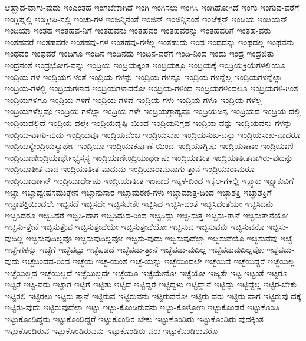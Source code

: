 {ಆಹ್ಲಾದ-ವಾಗು-ವುದು
ಇಂಎಂತಹ
ಇಂಗಬೇಕಾಗಿದೆ
ಇಂಗಿ
ಇಂಗಿಸಲು
ಇಂಗಿಸಿ
ಇಂಗಿಹೋಗಿದೆ
ಇಂಗು
ಇಂಗುವ-ವರೆಗೆ
ಇಂಗ್ಲಿಷ್ನಲ್ಲಿ
ಇಂಗ್ಲೀಷಿ-ನಲ್ಲಿ
ಇಂಚು-ಗಳ
ಇಂಜನ್ನಿನಂತೆ
ಇಂಜಿನ್
ಇಂಜಿನ್ನಿನಂತೆ
ಇಂಜೆಕ್ಷನ್
ಇಂಡಿಯ
ಇಂಡಿಯನ್
ಇಂಡಿಯಾ
ಇಂತಹ
ಇಂತಹವ-ನಿಗೆ
ಇಂತಹವನು
ಇಂತಹವರ
ಇಂತಹವರನ್ನು
ಇಂತಹವರಿಗೆ
ಇಂತಹ-ವರು
ಇಂತಹವರೆ
ಇಂತಹವರೇ
ಇಂತಹವು-ಗಳ
ಇಂತಹವು-ಗಳೆಲ್ಲ
ಇಂತಹುದು
ಇಂಥ
ಇಂಥದನ್ನು
ಇಂಥದಲ್ಲ
ಇಂಥವನು
ಇಂಥವರ
ಇಂಥವರೆ
ಇಂದಿಗೂ
ಇಂದಿನ
ಇಂದಿನದು
ಇಂದಿನ-ವರೆಗೆ
ಇಂದಿ-ನಿಂದ
ಇಂದು
ಇಂದ್ರ
ಇಂದ್ರಜಿತು
ಇಂದ್ರನಂತೆ
ಇಂದ್ರಭೋಗ-ವನ್ನು
ಇಂದ್ರಿಯ
ಇಂದ್ರಿಯಕ್ಕಿಂತ
ಇಂದ್ರಿಯಕ್ಕೂ
ಇಂದ್ರಿಯಕ್ಕೆ
ಇಂದ್ರಿಯಕ್ರಿಯೆಗಳಲ್ಲಿಯೂ
ಇಂದ್ರಿಯ-ಗಳ
ಇಂದ್ರಿಯಗ-ಳಂತೆ
ಇಂದ್ರಿಯ-ಗಳನ್ನು
ಇಂದ್ರಿಯ-ಗಳನ್ನೂ
ಇಂದ್ರಿಯ-ಗಳನ್ನೆಲ್ಲ
ಇಂದ್ರಿಯಗಳನ್ನೆಲ್ಲಾ
ಇಂದ್ರಿಯ-ಗಳಲ್ಲಿ
ಇಂದ್ರಿಯಗಳಾದ
ಇಂದ್ರಿಯಗಳಾದರೋ
ಇಂದ್ರಿಯ-ಗಳಿಂದ
ಇಂದ್ರಿಯಗಳಿಂದಲೂ
ಇಂದ್ರಿಯಗಳಿ-ಗಿಂತ
ಇಂದ್ರಿಯಗಳಿಗೂ
ಇಂದ್ರಿಯ-ಗಳಿಗೆ
ಇಂದ್ರಿಯ-ಗಳಿವೆ
ಇಂದ್ರಿಯ-ಗಳು
ಇಂದ್ರಿಯ-ಗಳೂ
ಇಂದ್ರಿಯ-ಗಳೆಲ್ಲ
ಇಂದ್ರಿಯಗಳೆಲ್ಲವೂ
ಇಂದ್ರಿಯ-ಗಳೆಲ್ಲಾ
ಇಂದ್ರಿಯ-ಗಳೇ
ಇಂದ್ರಿಯಗ್ರಾಹ್ಯವೂ
ಇಂದ್ರಿಯಜನ್ಯ
ಇಂದ್ರಿಯದ
ಇಂದ್ರಿಯ-ದಲ್ಲಿ
ಇಂದ್ರಿಯದಲ್ಲಿದೆ
ಇಂದ್ರಿಯ-ದಲ್ಲೇ
ಇಂದ್ರಿಯದೃಷ್ಟಿ-ಯಿಂದ
ಇಂದ್ರಿಯನಿಗ್ರಹ
ಇಂದ್ರಿಯ-ವನ್ನು
ಇಂದ್ರಿಯವಸ್ತು-ಗಳನ್ನು
ಇಂದ್ರಿಯ-ವಾಗು-ವುದು
ಇಂದ್ರಿಯವೂ
ಇಂದ್ರಿಯವೆಂಬ
ಇಂದ್ರಿಯಸುಖ
ಇಂದ್ರಿಯಸುಖ-ವನ್ನು
ಇಂದ್ರಿಯಸುಖ-ವಾದರೂ
ಇಂದ್ರಿಯಸ್ಯೇಂದ್ರಿಯಸ್ಯಾರ್ಥೇ
ಇಂದ್ರಿಯಾ
ಇಂದ್ರಿಯಾಕರ್ಷಣೆ-ಯಿಂದ
ಇಂದ್ರಿಯಾಗ್ನಿಷು
ಇಂದ್ರಿಯಾಣಾಂ
ಇಂದ್ರಿಯಾಣಿ
ಇಂದ್ರಿಯಾಣೀಂದ್ರಿಯಾರ್ಥೇಭ್ಯಸ್ತಸ್ಯ
ಇಂದ್ರಿಯಾಣೀಂದ್ರಿಯಾರ್ಥೇಷು
ಇಂದ್ರಿಯಾತೀತ
ಇಂದ್ರಿಯಾತೀತವಾಗಿರು-ವುದನ್ನು
ಇಂದ್ರಿಯಾತೀತ-ವಾದ
ಇಂದ್ರಿಯಾತೀತ-ವಾದುದು
ಇಂದ್ರಿಯಾರಾಮನಾಗು-ತ್ತಾನೆ
ಇಂದ್ರಿಯಾರಾಮರೂ
ಇಂದ್ರಿಯಾರ್ಥಾನ್
ಇಂದ್ರಿಯಾರ್ಥೇಷು
ಇಂದ್ರೀಯಾತೀತ
ಇಂಪಾದ
ಇಕ್ಕಳ-ದಿಂದ
ಇಕ್ಕೆಲ-ಗಳಲ್ಲಿ
ಇಕ್ಷ್ವಾಕು
ಇಕ್ಷ್ವಾಕುವಿಗೆ
ಇಚ್ಛಾ
ಇಚ್ಛಾದ್ವೇಷಸಮುತ್ಥೇನ
ಇಚ್ಛಾನುಸಾರ
ಇಚ್ಛಾಮರಣಿ-ಗಳು
ಇಚ್ಛಾಮಾತ್ರ-ದಿಂದ
ಇಚ್ಛಾಶಕ್ತಿ
ಇಚ್ಛಾಶಕ್ತಿಗೆ
ಇಚ್ಛಾಶಕ್ತಿಯಿಂದಲೇ
ಇಚ್ಛಿಸದೆ
ಇಚ್ಛಿಸದೇ
ಇಚ್ಛಿಸಬೇಕೇ
ಇಚ್ಛಿಸಿದ
ಇಚ್ಛಿಸಿ-ದಂತೆ
ಇಚ್ಛಿಸಿದಂತೆಯೇ
ಇಚ್ಛಿಸಿದನು
ಇಚ್ಛಿಸಿದರೂ
ಇಚ್ಛಿಸಿದರೆ
ಇಚ್ಛಿಸಿ-ದಾಗ
ಇಚ್ಛಿಸಿದುದ-ರಿಂದ
ಇಚ್ಛಿಸಿದ್ದು
ಇಚ್ಛಿ-ಸುತ್ತ
ಇಚ್ಛಿಸು-ತ್ತಾನೆ
ಇಚ್ಛಿಸುತ್ತಾನೆಯೋ
ಇಚ್ಛಿಸು-ತ್ತೇನೆ
ಇಚ್ಛಿಸುತ್ತೇವ
ಇಚ್ಛಿಸುತ್ತೇವೆಯೇ
ಇಚ್ಛಿಸುತ್ತೇವೆಯೋ
ಇಚ್ಛಿಸುವ
ಇಚ್ಛಿಸುವನು
ಇಚ್ಛಿಸುವನೊ
ಇಚ್ಛಿಸು-ವುದಿಲ್ಲ
ಇಚ್ಛಿಸುವುದಿಲ್ಲವೊ
ಇಚ್ಛಿಸುವುದಿಲ್ಲವೋ
ಇಚ್ಛಿಸು-ವುದು
ಇಚ್ಛಿಸುವುದೆಲ್ಲಾ
ಇಚ್ಛಿಸುವೆಯೊ
ಇಚ್ಛಿಸುವೆವು
ಇಚ್ಛೆ
ಇಚ್ಛೆ-ಗಳನ್ನು
ಇಚ್ಛೆಗೆ
ಇಚ್ಛೆಪಟ್ಟು
ಇಚ್ಛೆಪಡದೆ
ಇಚ್ಛೆಪಡು-ತ್ತಾನೆ
ಇಚ್ಛೆಪಡು-ವುದಿಲ್ಲ
ಇಚ್ಛೆಪಡುವುದಿಲ್ಲವೋ
ಇಚ್ಛೆಪಡು-ವುದು
ಇಚ್ಛೆಬಂದವ-ರಿಂದ
ಇಚ್ಛೆಯ
ಇಚ್ಛೆ-ಯಂತೆ
ಇಚ್ಛೆ-ಯನ್ನು
ಇಚ್ಛೆಯಿಂದಲೇ
ಇಚ್ಛೆಯಿದೆ
ಇಚ್ಛೆಯಿದ್ದರೆ
ಇಚ್ಛೆಯಿಲ್ಲ
ಇಚ್ಛೆಯಿಲ್ಲದ
ಇಚ್ಛೆಯಿಲ್ಲದೆ
ಇಚ್ಛೆಯಿಲ್ಲದೇ
ಇಚ್ಛೆಯೂ
ಇಚ್ಛೆಯೇನೋ
ಇಚ್ಛೆಯೋ
ಇಜ್ಯತೇ
ಇಟ್ಟ
ಇಟ್ಟಂತೆ
ಇಟ್ಟರೂ
ಇಟ್ಟರೆ
ಇಟ್ಟ-ವರು
ಇಟ್ಟಾಗ
ಇಟ್ಟಿಗೆ
ಇಟ್ಟಿತು
ಇಟ್ಟಿದೆ
ಇಟ್ಟಿದ್ದರೆ
ಇಟ್ಟಿದ್ದಳು
ಇಟ್ಟಿದ್ದಾನೆ
ಇಟ್ಟಿದ್ದು
ಇಟ್ಟಿದ್ದೆಲ್ಲ
ಇಟ್ಟಿರ-ಬೇಕು
ಇಟ್ಟಿರಲಿ
ಇಟ್ಟಿರಲು
ಇಟ್ಟಿರು-ತ್ತಾನೆ
ಇಟ್ಟಿರುವ
ಇಟ್ಟಿರುವನು
ಇಟ್ಟಿರುವನೋ
ಇಟ್ಟಿರು-ವರು
ಇಟ್ಟಿರು-ವಾಗ
ಇಟ್ಟಿರುವು-ದಕ್ಕೆ
ಇಟ್ಟಿರು-ವುದು
ಇಟ್ಟಿರುವುದೆಲ್ಲಾ
ಇಟ್ಟು
ಇಟ್ಟು-ಕೊಂಡಿರುವನು
ಇಟ್ಟು-ಕೊಳ್ಳೋಣ
ಇಟ್ಟುಕೊಂಡರೆ
ಇಟ್ಟುಕೊಂಡಿ
ಇಟ್ಟುಕೊಂಡಿದ್ದರು
ಇಟ್ಟುಕೊಂಡಿದ್ದರೆ
ಇಟ್ಟುಕೊಂಡಿರ-ಬೇಕು
ಇಟ್ಟುಕೊಂಡಿರು
ಇಟ್ಟುಕೊಂಡಿರು-ವುದಕ್ಕಿಂತ
ಇಟ್ಟುಕೊಂಡಿರುವ
ಇಟ್ಟುಕೊಂಡಿರುವನು
ಇಟ್ಟುಕೊಂಡಿರು-ವರು
ಇಟ್ಟುಕೊಂಡಿರುವರೊ
}
